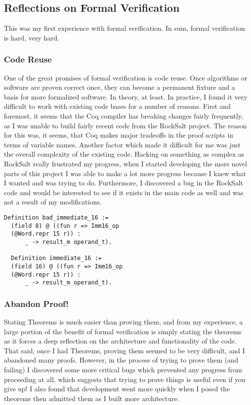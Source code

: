 \documentclass[preprint,12pt]{sigplanconf}
\begin{document}
\subsection{Reflections on Formal Verification}
This was my first experience with formal verification. In sum, formal
verification is hard, very hard.


\subsubsection{Code Reuse}
One of the great promises of formal verification is code reuse. Once
algorithms or software are proven correct once, they can become a permanent
fixture and a basis for more formalized software. In theory, at
least. In practice, I found it very difficult to work with existing
code bases for a number of reasons. First and foremost, it seems that
the Coq compiler has breaking changes fairly frequently, as I was
unable to build fairly recent code from the RockSalt project. The
reason for this was, it seems, that Coq makes major tradeoffs in the
proof scripts in terms of variable names. Another factor which made it
difficult for me was just the overall complexity of the existing
code. Hacking on something as complex as RockSalt really frustrated
my progress, when I started developing the more novel parts of this
project I was able to make a lot more progress because I knew what I 
wanted and was trying to do. Furthermore, I discovered a bug in the
RockSalt code and would be interested to see if it exists in the
main code as well and was not a result of my modifications.
\begin{lstlisting}[language=Coq, caption={The RockSalt bug: the parser
helper for immediate constants only reads the MSB of the constant}]
  Definition bad_immediate_16 := 
  (field 8) @ ((fun r => Imm16_op
  (@Word.repr 15 r)) :
      _ -> result_m operand_t).

  Definition immediate_16 := 
  (field 16) @ ((fun r => Imm16_op
  (@Word.repr 15 r)) :
      _ -> result_m operand_t).
\end{lstlisting}

\subsubsection{Abandon Proof!}
Stating Theorems is much easier than proving them, and from my
experience, a large portion of the benefit of formal verification
is simply stating the theorems as it forces a deep reflection on the
architecture and functionality of the code. That said, once I had
Theorems, proving them seemed to be very difficult, and I abandoned
many proofs. However, in the process of trying to prove them (and
failing) I discovered some more critical bugs which prevented any
progress from proceeding at all, which suggests that trying
to prove things is useful even if you give up! I also found that
development went more quickly when I posed the theorems then admitted
them as I built more architecture.
\end{document}
